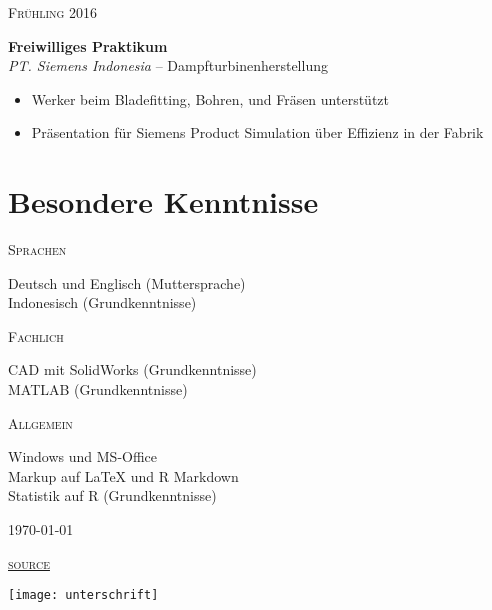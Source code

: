 \documentclass[a4paper]{article}
\newcommand{\entry}[4]{

	\begin{minipage}[t]{.20\textwidth}
		\hfill \textsc{#1}

	\end{minipage}
	\hfill\vline\hfill
	\begin{minipage}[t]{.75\textwidth}
		\textbf{#2} \\ 
		\textit{#3}    
		#4

	\end{minipage} 
	\vspace{.25cm}

}
\newcommand{\nentry}[2]{

	\begin{minipage}[t]{.20\textwidth}
		\hfill \textsc{#1}

	\end{minipage}
	\hfill\vline\hfill
	\begin{minipage}[t]{.75\textwidth}
		#2 

	\end{minipage}
	\vspace{.25cm} 

}
\begin{document}
\entry{Fr{\"u}hling 2016}{Freiwilliges Praktikum}{PT. Siemens Indonesia}{-- Dampfturbinenherstellung\vspace{-.25cm} 
	\begin{itemize}[leftmargin=*]
		\setlength{\itemsep}{-3pt}
	\item Werker beim Bladefitting, Bohren, und Fr{\"a}sen unterst{\"u}tzt 
			\item Pr{\"a}sentation f{\"u}r Siemens Product Simulation {\"u}ber Effizienz in der Fabrik
	\end{itemize}	
}

\section{Besondere Kenntnisse}

\nentry{Sprachen}{Deutsch und Englisch (Muttersprache)\\ Indonesisch (Grundkenntnisse)}

\nentry{Fachlich}{CAD mit SolidWorks (Grundkenntnisse) \\ MATLAB (Grundkenntnisse)}

\nentry{Allgemein}{Windows und MS-Office\\Markup auf {\LaTeX} und R Markdown\\Statistik auf R (Grundkenntnisse)}

\vspace*{\fill} 
\begin{minipage}{0.4\textwidth}
	\today
\end{minipage}
\begin{minipage}{0.19\textwidth}
	\centering
	\href{https://github.com/emfiedler/cv}{\textsc{source}}
\end{minipage}
\begin{minipage}{0.4\textwidth}
	\flushright
	\texttt{[image: unterschrift]}
\end{minipage}
\end{document}
